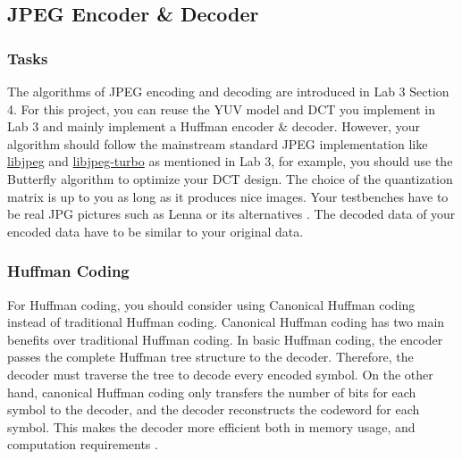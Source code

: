 \documentclass[a4paper,12pt,twoside]{article}
\begin{document}
\subsection{JPEG Encoder \& Decoder}
\subsubsection{Tasks}
The algorithms of JPEG encoding and decoding are introduced in Lab 3 Section 4. For this project, you can reuse the YUV model and DCT you implement in Lab 3 and mainly implement a Huffman encoder \& decoder. However, your algorithm should follow the mainstream standard JPEG implementation like \href{https://github.com/LuaDist/libjpeg}{libjpeg} and \href{https://github.com/libjpeg-turbo/libjpeg-turbo}{libjpeg-turbo} as mentioned in Lab 3, for example, you should use the Butterfly algorithm to optimize your DCT design. The choice of the quantization matrix is up to you as long as it produces nice images. Your testbenches have to be real JPG pictures such as Lenna or its alternatives \cite{doi:10.1080/09500340.2016.1270881}. The decoded data of your encoded data have to be similar to your original data.
\subsubsection{Huffman Coding}
For Huffman coding, you should consider using Canonical Huffman coding instead of traditional Huffman coding. Canonical Huffman coding has two main benefits over traditional Huffman coding. In basic Huffman coding, the encoder passes the complete Huffman tree structure to the decoder. Therefore, the decoder must traverse the tree to decode every encoded symbol. On the other hand, canonical Huffman coding only transfers the number of bits for each symbol to the decoder, and the decoder reconstructs the codeword for each symbol. This makes the decoder more efficient both in memory usage, and computation requirements \cite{2018arXiv180503648K}.
\end{document}
